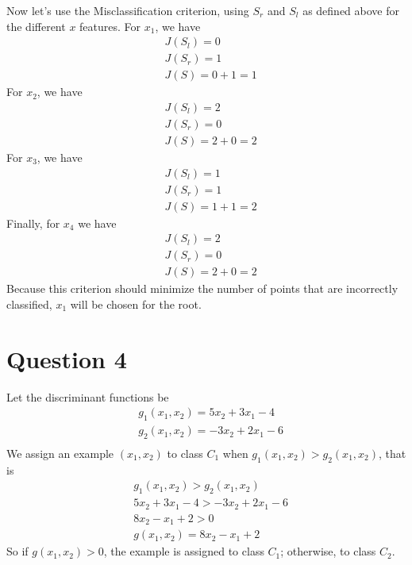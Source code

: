 \documentclass[leqno]{article}
\begin{document}
\noindent Now let's use the Misclassification criterion, using $S_r$ and $S_l$ as defined above for the different $x$ features. 
For $x_1$, we have
\begin{equation*}
\begin{split}
&J(S_l) = 0\\
&J(S_r) = 1\\
&J(S) = 0 + 1 = 1
\end{split}
\end{equation*}
For $x_2$, we have
\begin{equation*}
\begin{split}
&J(S_l) = 2\\
&J(S_r) = 0\\
&J(S) = 2 + 0 = 2
\end{split}
\end{equation*}
For $x_3$, we have
\begin{equation*}
\begin{split}
&J(S_l) = 1\\
&J(S_r) = 1\\
&J(S) = 1 + 1 = 2
\end{split}
\end{equation*}
Finally, for $x_4$ we have
\begin{equation*}
\begin{split}
&J(S_l) = 2\\
&J(S_r) = 0\\
&J(S) = 2 + 0 = 2
\end{split}
\end{equation*}
Because this criterion should minimize the number of points that are incorrectly classified, $x_1$ will be chosen for the root.

\hfill

\section*{Question 4} Let the discriminant functions be
\begin{equation*}
\begin{split}
&g_1(x_1, x_2) = 5x_2 + 3x_1 - 4\\
&g_2(x_1, x_2) = -3x_2 + 2x_1 - 6\\
\end{split}
\end{equation*}
We assign an example $(x_1, x_2)$ to class $C_1$ when $g_1(x_1, x_2) > g_2(x_1, x_2)$, that is
\begin{equation*}
\begin{split}
&g_1(x_1, x_2) > g_2(x_1, x_2)\\
&5x_2 + 3x_1 - 4 > -3x_2 + 2x_1 - 6\\
&8x_2 - x_1 + 2 > 0\\
&g(x_1, x_2) = 8x_2 - x_1 + 2
\end{split}
\end{equation*}
So if $g(x_1, x_2) > 0$, the example is assigned to class $C_1$; otherwise, to class $C_2$. 
\end{document}
